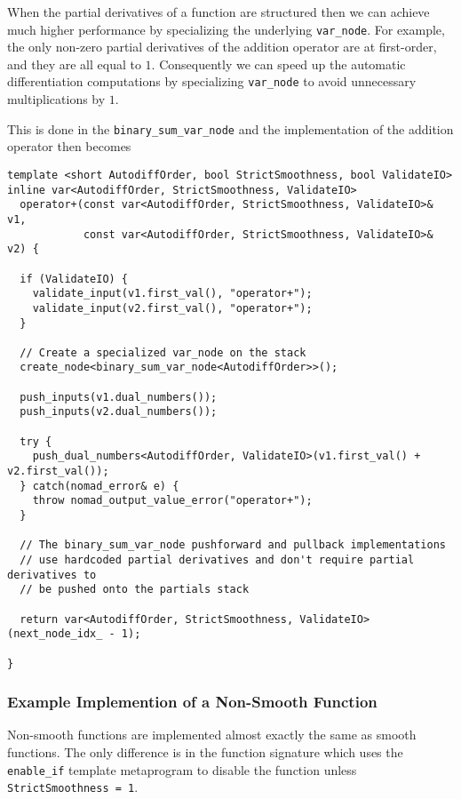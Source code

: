 When the partial derivatives of a function are structured then we can achieve
much higher performance by specializing the underlying \verb|var_node|.
For example, the only non-zero partial derivatives of the addition operator
are at first-order, and they are all equal to $1$.  Consequently we can speed
up the automatic differentiation computations by specializing \verb|var_node|
to avoid unnecessary multiplications by $1$.

This is done in the \verb|binary_sum_var_node| and the implementation of
the addition operator then becomes
%
\begin{verbatim}
template <short AutodiffOrder, bool StrictSmoothness, bool ValidateIO>
inline var<AutodiffOrder, StrictSmoothness, ValidateIO>
  operator+(const var<AutodiffOrder, StrictSmoothness, ValidateIO>& v1,
            const var<AutodiffOrder, StrictSmoothness, ValidateIO>& v2) {

  if (ValidateIO) {
    validate_input(v1.first_val(), "operator+");
    validate_input(v2.first_val(), "operator+");
  }
      
  // Create a specialized var_node on the stack
  create_node<binary_sum_var_node<AutodiffOrder>>();
    
  push_inputs(v1.dual_numbers());
  push_inputs(v2.dual_numbers());
    
  try {
    push_dual_numbers<AutodiffOrder, ValidateIO>(v1.first_val() + v2.first_val());
  } catch(nomad_error& e) {
    throw nomad_output_value_error("operator+");
  }
    
  // The binary_sum_var_node pushforward and pullback implementations
  // use hardcoded partial derivatives and don't require partial derivatives to 
  // be pushed onto the partials stack
    
  return var<AutodiffOrder, StrictSmoothness, ValidateIO>(next_node_idx_ - 1);
    
}
\end{verbatim}

\subsubsection{Example Implemention of a Non-Smooth Function}

Non-smooth functions are implemented almost exactly the same as smooth functions.
The only difference is in the function signature which uses the \verb|enable_if|
template metaprogram to disable the function unless \verb|StrictSmoothness = 1|.


